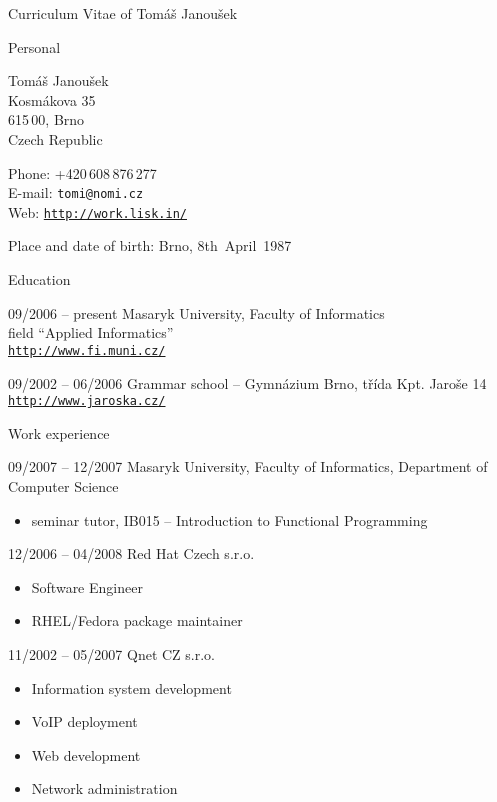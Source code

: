 \documentclass[12pt,a4paper,english,pdftex]{article}
\begin{document}
\begin{cv}{Curriculum Vitae of Tomáš Janoušek}
    \begin{cvlist}{Personal}
        \item
            Tomáš Janoušek \\
            Kosmákova 35 \\
            615\,00, Brno \\
            Czech Republic
        \item
            Phone: +420\,608\,876\,277 \\
            E-mail: \texttt{tomi@nomi.cz} \\
            Web: \href{http://work.lisk.in/}{\texttt{http://work.lisk.in/}}
        \item
            Place and date of birth: Brno, 8th~April~1987
    \end{cvlist}

    \begin{cvlist}{Education}
        \item[09/2006 -- present]
            Masaryk University, Faculty of Informatics \\
            field ``Applied Informatics'' \\
            \href{http://www.fi.muni.cz/}{\texttt{http://www.fi.muni.cz/}}
        \item[09/2002 -- 06/2006]
            Grammar school -- Gymnázium Brno, třída Kpt. Jaroše 14 \\
            \href{http://www.jaroska.cz/}{\texttt{http://www.jaroska.cz/}}
    \end{cvlist}

    \begin{cvlist}{Work experience}
        \item[09/2007 -- 12/2007]
            Masaryk University, Faculty of Informatics, Department of Computer
	    Science
            \begin{itemize}
                \item seminar tutor, IB015 -- Introduction to Functional
		Programming
            \end{itemize}
        \item[12/2006 -- 04/2008]
            Red Hat Czech s.r.o.
            \begin{itemize}
                \item Software Engineer
                \item RHEL/Fedora package maintainer
            \end{itemize}
        \item[11/2002 -- 05/2007]
            Qnet CZ s.r.o.
            \begin{itemize}
                \item Information system development
                \item VoIP deployment
                \item Web development
                \item Network administration
            \end{itemize}
    \end{cvlist}


\end{cv}
\end{document}
